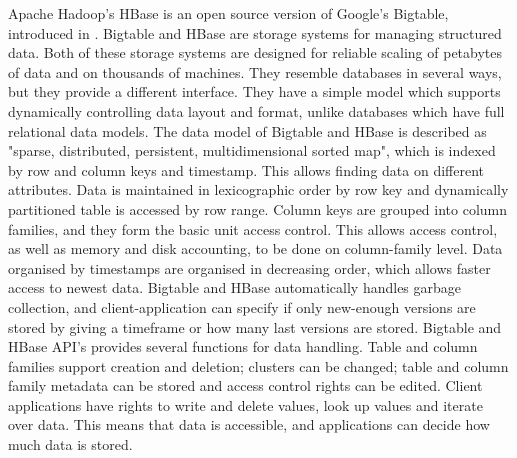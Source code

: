 \documentclass{article}
\theoremstyle{definition}
\begin{document}
Apache Hadoop's HBase is an open source version of Google's Bigtable, introduced in \cite{Chang}. Bigtable and HBase are storage systems for managing structured data. Both of these storage systems are designed for reliable scaling of petabytes of data and on thousands of machines. They resemble databases in several ways, but they provide a different interface. They have a simple model which supports dynamically controlling data layout and format, unlike databases which have full relational data models. The data model of Bigtable and HBase is described as "sparse, distributed, persistent, multidimensional sorted map", which is indexed by row and column keys and timestamp. This allows finding data on different attributes. Data is maintained in lexicographic order by row key and dynamically partitioned table is accessed by row range. Column keys are grouped into column families, and they form the basic unit access control. This allows access control, as well as memory and disk accounting, to be done on column-family level. Data organised by timestamps are organised in decreasing order, which allows faster access to newest data. 
Bigtable and HBase automatically handles garbage collection, and client-application can specify if only new-enough versions are stored by giving a timeframe or how many last versions are stored. 
Bigtable and HBase API's provides several functions for data handling. Table and column families support creation and deletion; clusters can be changed; table and column family metadata can be stored and access control rights can be edited. Client applications have rights to write and delete values, look up values and iterate over data. This means that data is accessible, and applications can decide how much data is stored. \\ 
\end{document}
